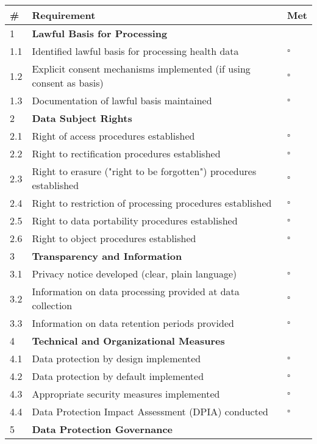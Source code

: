 \begin{tcolorbox}[title=GDPR Compliance Checklist for Digital Health Applications]
\begin{tabular}{|p{1cm}|p{12cm}|p{1cm}|}
\hline
\textbf{\#} & \textbf{Requirement} & \textbf{Met} \\
\hline
1 & \textbf{Lawful Basis for Processing} & \\
\hline
1.1 & Identified lawful basis for processing health data & $\square$ \\
\hline
1.2 & Explicit consent mechanisms implemented (if using consent as basis) & $\square$ \\
\hline
1.3 & Documentation of lawful basis maintained & $\square$ \\
\hline
2 & \textbf{Data Subject Rights} & \\
\hline
2.1 & Right of access procedures established & $\square$ \\
\hline
2.2 & Right to rectification procedures established & $\square$ \\
\hline
2.3 & Right to erasure ("right to be forgotten") procedures established & $\square$ \\
\hline
2.4 & Right to restriction of processing procedures established & $\square$ \\
\hline
2.5 & Right to data portability procedures established & $\square$ \\
\hline
2.6 & Right to object procedures established & $\square$ \\
\hline
3 & \textbf{Transparency and Information} & \\
\hline
3.1 & Privacy notice developed (clear, plain language) & $\square$ \\
\hline
3.2 & Information on data processing provided at data collection & $\square$ \\
\hline
3.3 & Information on data retention periods provided & $\square$ \\
\hline
4 & \textbf{Technical and Organizational Measures} & \\
\hline
4.1 & Data protection by design implemented & $\square$ \\
\hline
4.2 & Data protection by default implemented & $\square$ \\
\hline
4.3 & Appropriate security measures implemented & $\square$ \\
\hline
4.4 & Data Protection Impact Assessment (DPIA) conducted & $\square$ \\
\hline
5 & \textbf{Data Protection Governance} & \\

\end{tabular}
\end{tcolorbox}
